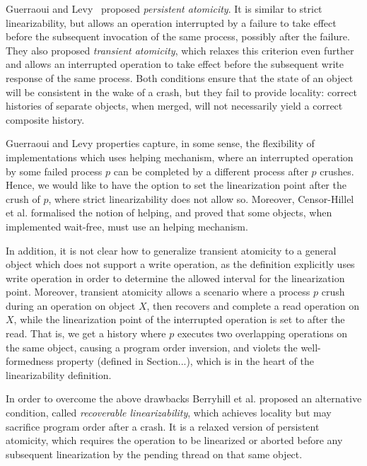 Guerraoui and Levy~\cite{DBLP:conf/icdcs/GuerraouiL04} proposed \emph{persistent atomicity}. It is similar to strict linearizability, but allows an operation interrupted by a failure to take effect before the subsequent invocation of the same process, possibly after the failure. They also proposed \emph{transient atomicity}, which relaxes this criterion even further and allows an interrupted operation to take effect before the subsequent write response of the same process. Both conditions ensure that the state of an object will be consistent in the wake of a crash, but they fail to provide locality: correct histories of separate objects, when merged, will not necessarily yield a correct composite history.

Guerraoui and Levy properties capture, in some sense, the flexibility of implementations which uses helping mechanism, where an interrupted operation by some failed process $p$ can be completed by a different process after $p$ crushes. Hence, we would like to have the option to set the linearization point after the crush of $p$, where strict linearizability does not allow so. Moreover, Censor-Hillel et al. \cite{DBLP:conf/podc/Censor-HillelPT15} formalised the notion of helping, and proved that some objects, when implemented wait-free, must use an helping mechanism.

In addition, it is not clear how to generalize transient atomicity to a general object which does not support a write operation, as the definition explicitly uses write operation in order to determine the allowed interval for the linearization point. Moreover, transient atomicity allows a scenario where a process $p$ crush during an operation on object $X$, then recovers and complete a read operation on $X$, while the linearization point of the interrupted operation is set to after the read. That is, we get a history where $p$ executes two overlapping operations on the same object, causing a program order inversion, and violets the well-formedness property (defined in Section...), which is in the heart of the linearizability definition.

In order to overcome the above drawbacks Berryhill et al. \cite{DBLP:conf/opodis/BerryhillGT15} proposed an alternative condition, called \emph{recoverable linearizability}, which achieves locality but may sacrifice program order after a crash. It is a relaxed version of persistent atomicity, which requires the operation to be linearized or aborted before any subsequent linearization by the pending thread on that same object.

